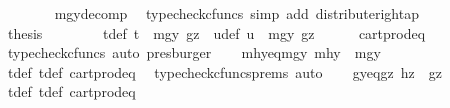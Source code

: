 \begin{isabellebody}
\ \ \ \ \ \ \isamarkupfalse%
\ mgy{\isacharunderscore}{\kern0pt}decomp\ \isamarkupfalse%
\ {\isacharparenleft}{\kern0pt}typecheck{\isacharunderscore}{\kern0pt}cfuncs{\isacharcomma}{\kern0pt}\ simp\ add{\isacharcolon}{\kern0pt}\ distribute{\isacharunderscore}{\kern0pt}right{\isacharunderscore}{\kern0pt}ap{\isacharparenright}{\kern0pt}\isanewline
\ \ \ \ \isamarkupfalse%
\ \isamarkupfalse%
\ {\isacharquery}{\kern0pt}thesis\isacommand{{\isachardot}{\kern0pt}}\isamarkupfalse%
\isanewline
\ \ \isamarkupfalse%
\isanewline
\ \ \isamarkupfalse%
\ \isamarkupfalse%
\ t{\isacharunderscore}{\kern0pt}def{}{\isacharcolon}{\kern0pt}\ {\isachardoublequoteopen}t\ {\isacharequal}{\kern0pt}\ {\isasymlangle}mgy{}{\isacharcomma}{\kern0pt}\ gz{\isasymrangle}{\isachardoublequoteclose}\ \ u{\isacharunderscore}{\kern0pt}def{\isacharcolon}{\kern0pt}\ {\isachardoublequoteopen}u\ {\isacharequal}{\kern0pt}\ {\isasymlangle}mgy{}{\isacharcomma}{\kern0pt}\ gz{\isasymrangle}{\isachardoublequoteclose}\isanewline
\ \ \ \ \isamarkupfalse%
\ cart{\isacharunderscore}{\kern0pt}prod{\isacharunderscore}{\kern0pt}eq{}\ \isamarkupfalse%
\ {\isacharparenleft}{\kern0pt}typecheck{\isacharunderscore}{\kern0pt}cfuncs{\isacharcomma}{\kern0pt}\ auto{\isacharcomma}{\kern0pt}\ presburger{\isacharparenright}{\kern0pt}\isanewline
\isanewline
\ \ \isamarkupfalse%
\ mhy{}{\isacharunderscore}{\kern0pt}eq{\isacharunderscore}{\kern0pt}mgy{}{\isacharcolon}{\kern0pt}\ {\isachardoublequoteopen}mhy{}\ {\isacharequal}{\kern0pt}\ mgy{}{\isachardoublequoteclose}\isanewline
\ \ \ \ \isamarkupfalse%
\ t{\isacharunderscore}{\kern0pt}def{}\ t{\isacharunderscore}{\kern0pt}def\ cart{\isacharunderscore}{\kern0pt}prod{\isacharunderscore}{\kern0pt}eq{}\ \isamarkupfalse%
\ {\isacharparenleft}{\kern0pt}typecheck{\isacharunderscore}{\kern0pt}cfuncs{\isacharunderscore}{\kern0pt}prems{\isacharcomma}{\kern0pt}\ auto{\isacharparenright}{\kern0pt}\isanewline
\ \ \isamarkupfalse%
\ gy{\isacharunderscore}{\kern0pt}eq{\isacharunderscore}{\kern0pt}gz{\isacharcolon}{\kern0pt}\ {\isachardoublequoteopen}hz\ {\isacharequal}{\kern0pt}\ gz{\isachardoublequoteclose}\isanewline
\ \ \ \ \isamarkupfalse%
\ t{\isacharunderscore}{\kern0pt}def{}\ t{\isacharunderscore}{\kern0pt}def\ cart{\isacharunderscore}{\kern0pt}prod{\isacharunderscore}{\kern0pt}eq{}\ \isamarkupfalse%

\end{isabellebody}
